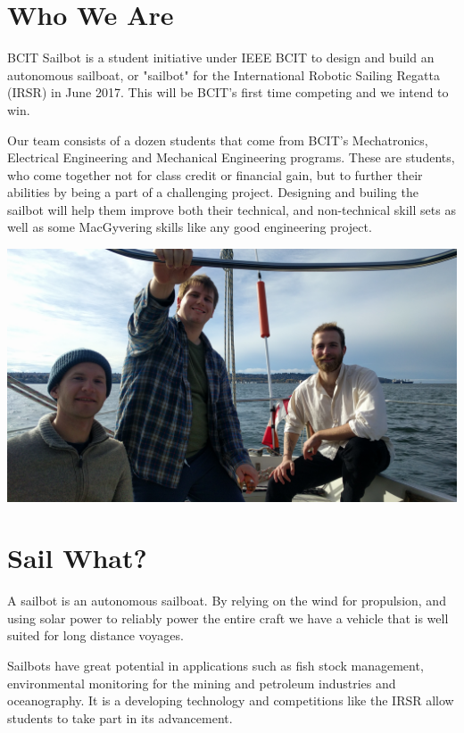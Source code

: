 \documentclass{article}
\begin{document}


\section*{Who We Are}
BCIT Sailbot is a student initiative under IEEE BCIT to design and build an
autonomous sailboat, or "sailbot" for the International Robotic Sailing Regatta 
(IRSR) in June 2017. This will be BCIT's first time competing and we intend to 
win. 

Our team consists of a dozen students that come from BCIT's Mechatronics, 
Electrical Engineering and Mechanical Engineering programs. These are students, 
who come together not for class credit or financial gain, but to further their 
abilities by being a part of a challenging project. Designing and builing the 
sailbot will help them improve both their technical, and non-technical skill 
sets as well as some MacGyvering skills like any good engineering project.

\begin{center}
    \includegraphics[scale=0.1]{Sailing.jpg}
\end{center}

\section*{Sail What?}
A sailbot is an autonomous sailboat. By relying on the wind for propulsion, and 
using solar power to reliably power the entire craft we have a vehicle that is
well suited for long distance voyages.

Sailbots have great potential in applications such as fish stock management, 
environmental monitoring for the mining and petroleum industries and 
oceanography. It is a developing technology and competitions like the IRSR allow
students to take part in its advancement.
\end{document}
